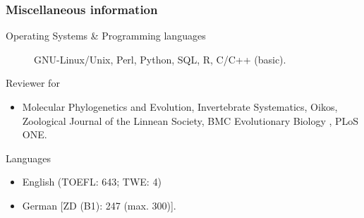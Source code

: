 \documentclass[letter,10pt]{article}
\begin{document}
\subsubsection*{Miscellaneous information}
\begin{small}
	\begin{description}
		\item[Operating Systems \& Programming languages] GNU-Linux/Unix, Perl, Python, SQL, R, C/C++ (basic).
		\item[Reviewer for]
	\end{description}

	\begin{itemize}
		\item Molecular Phylogenetics and Evolution, Invertebrate Systematics, Oikos, Zoological Journal of the Linnean Society, BMC Evolutionary Biology , PLoS ONE.
	\end{itemize}

	\begin{description}
		\item[Languages]
	\end{description}

	\begin{itemize}
		\item English (TOEFL: 643; TWE: 4)
		\item German [ZD (B1): 247 (max. 300)].
	\end{itemize}



\end{small}
\end{document}
